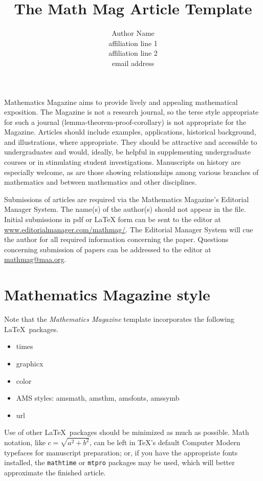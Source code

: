 \documentclass{article}
\theoremstyle{theorem}
\theoremstyle{definition}
\begin{document}
\title{The Math Mag Article Template}

\author{Author Name\\               %
\scriptsize affiliation line 1\\    %
affiliation line 2\\                %
email address}                      %

\maketitle

\noindent  Mathematics Magazine aims to provide lively and appealing mathematical exposition. The Magazine is not a research journal, so the terse style appropriate for such a journal (lemma-theorem-proof-corollary) is not appropriate for the Magazine. Articles should include examples, applications, historical background, and illustrations, where appropriate. They should be attractive and accessible to undergraduates and would, ideally, be helpful in supplementing undergraduate courses or in stimulating student investigations. Manuscripts on history are especially welcome, as are those showing relationships among various branches of mathematics and between mathematics and other disciplines.

Submissions of articles are required via the Mathematics Magazine's Editorial Manager System. The name(s) of the author(s) should not appear in the file. Initial submissions in pdf or LaTeX form can be sent to the editor at \href{http://www.editorialmanager.com/mathmag/}{\url{www.editorialmanager.com/mathmag/}}. 
The Editorial Manager System will cue the author for all required information concerning the paper. Questions concerning submission of papers can be addressed to the editor at \href{mathmag@maa.org}{\url{mathmag@maa.org}}.

\section{Mathematics Magazine style}

Note that the \textit{Mathematics Magazine} template incorporates the following \LaTeX\ packages.  
\begin{itemize}
\item times
\item graphicx
\item color
\item AMS styles: amsmath, amsthm, amsfonts, amssymb
\item url
\end{itemize}
Use of other \LaTeX\ packages should be minimized as much as possible. Math notation, like $c = \sqrt{a^2 +b^2}$, can be left in \TeX's default Computer Modern typefaces for manuscript preparation; or, if you have the appropriate fonts installed, the \texttt{mathtime} or \texttt{mtpro} packages may be used, which will better approximate the finished article.
\end{document}
